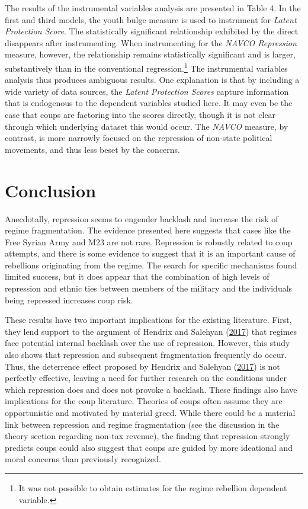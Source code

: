 \documentclass[12pt,]{article}
\let\rmarkdownfootnote\footnote%
\def\footnote{\protect\rmarkdownfootnote}
\theoremstyle{definition}
\theoremstyle{definition}
\theoremstyle{definition}
\theoremstyle{remark}
\begin{document}
The results of the instrumental variables analysis are presented in
Table 4. In the first and third models, the youth bulge measure is used
to instrument for \emph{Latent Protection Score}. The statistically
significant relationship exhibited by the direct disappears after
instrumenting. When instrumenting for the \emph{NAVCO Repression}
measure, however, the relationship remains statistically significant and
is larger, substantively than in the conventional regression.\footnote{It
  was not possible to obtain estimates for the regime rebellion
  dependent variable.} The instrumental variables analysis thus produces
ambiguous results. One explanation is that by including a wide variety
of data sources, the \emph{Latent Protection Scores} capture information
that is endogenous to the dependent variables studied here. It may even
be the case that coups are factoring into the scores directly, though it
is not clear through which underlying dataset this would occur. The
\emph{NAVCO} measure, by contrast, is more narrowly focused on the
repression of non-state political movements, and thus less beset by the
concerns.

\hypertarget{conclusion}{%
\section{Conclusion}\label{conclusion}}

Anecdotally, repression seems to engender backlash and increase the risk
of regime fragmentation. The evidence presented here suggests that cases
like the Free Syrian Army and M23 are not rare. Repression is robustly
related to coup attempts, and there is some evidence to suggest that it
is an important cause of rebellions originating from the regime. The
search for specific mechanisms found limited success, but it does appear
that the combination of high levels of repression and ethnic ties
between members of the military and the individuals being repressed
increases coup risk.

These results have two important implications for the existing
literature. First, they lend support to the argument of Hendrix and
Salehyan (\protect\hyperlink{ref-Hendrix2017}{2017}) that regimes face
potential internal backlash over the use of repression. However, this
study also shows that repression and subsequent fragmentation frequently
do occur. Thus, the deterrence effect proposed by Hendrix and Salehyan
(\protect\hyperlink{ref-Hendrix2017}{2017}) is not perfectly effective,
leaving a need for further research on the conditions under which
repression does and does not provoke a backlash. These findings also
have implications for the coup literature. Theories of coups often
assume they are opportunistic and motivated by material greed. While
there could be a material link between repression and regime
fragmentation (see the discussion in the theory section regarding
non-tax revenue), the finding that repression strongly predicts coups
could also suggest that coups are guided by more ideational and moral
concerns than previously recognized.
\end{document}
